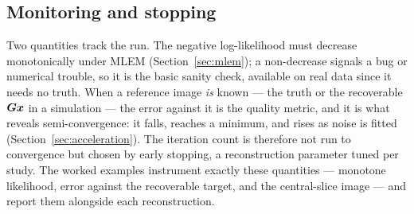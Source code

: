 \subsection{Monitoring and stopping}
\label{sec:pipeline:monitor}

Two quantities track the run. The negative log-likelihood
 must decrease monotonically under MLEM
(Section~\ref{sec:mlem}); a non-decrease signals a bug or numerical trouble, so it
is the basic sanity check, available on real data since it needs no truth. When a
reference image \emph{is} known --- the truth or the recoverable $\bm{G}\bm{x}$ in a
simulation --- the error against it is the quality metric, and it is what reveals
semi-convergence: it falls, reaches a minimum, and rises as noise is fitted
(Section~\ref{sec:acceleration}). The iteration count is therefore not run to
convergence but chosen by early stopping, a reconstruction parameter tuned per
study. The worked examples instrument exactly these quantities --- monotone
likelihood, error against the recoverable target, and the central-slice image ---
and report them alongside each reconstruction.
